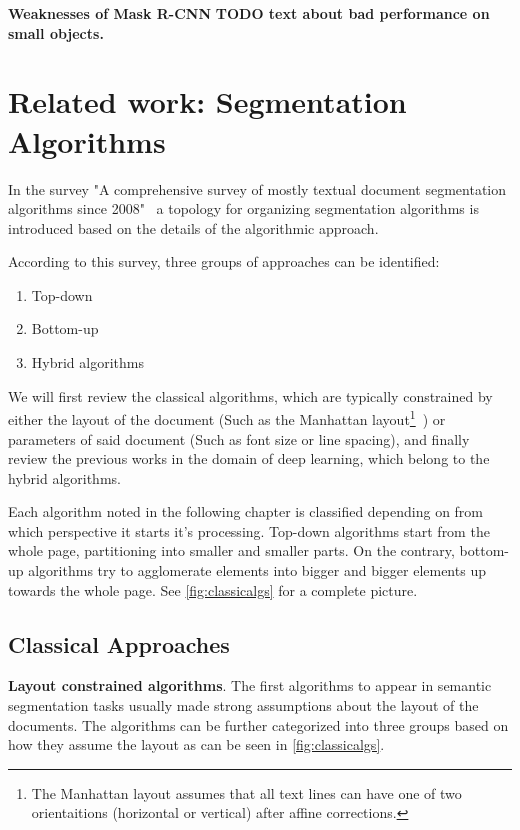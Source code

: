\documentclass[english, bibtex]{kththesis}
\begin{document}
\textbf{Weaknesses of Mask R-CNN} \textbf{TODO text about bad performance on small objects.}~\cite{DBLP:journals/corr/abs-1902-07296}

\section{Related work: Segmentation Algorithms}

In the survey "A comprehensive survey of mostly textual document segmentation algorithms since 2008"~\cite{ESKENAZI20171} a topology for organizing segmentation algorithms is introduced based on the details of the algorithmic approach. 

According to this survey, three groups of approaches can be identified: 

\begin{enumerate}
\item Top-down
\item Bottom-up
\item Hybrid algorithms
\end{enumerate}

We will first review the classical algorithms, which are typically constrained by either the layout of the document (Such as the Manhattan layout\footnote{The Manhattan layout assumes that all text lines can have one of two orientaitions (horizontal or vertical) after affine corrections.}~\cite{395720}) or parameters of said document (Such as font size or line spacing), and finally review the previous works in the domain of deep learning, which belong to the hybrid algorithms.

Each algorithm noted in the following chapter is classified depending on from which perspective it starts it's processing. Top-down algorithms start from the whole page, partitioning into smaller and smaller parts. On the contrary, bottom-up algorithms try to agglomerate elements into bigger and bigger elements up towards the whole page. See \autoref{fig:classicalgs} for a complete picture.

\subsection{Classical Approaches}

\textbf{Layout constrained algorithms}. The first algorithms to appear in semantic segmentation tasks usually made strong assumptions about the layout of the documents. The algorithms can be further categorized into three groups based on how they assume the layout as can be seen in \autoref{fig:classicalgs}.
\end{document}

